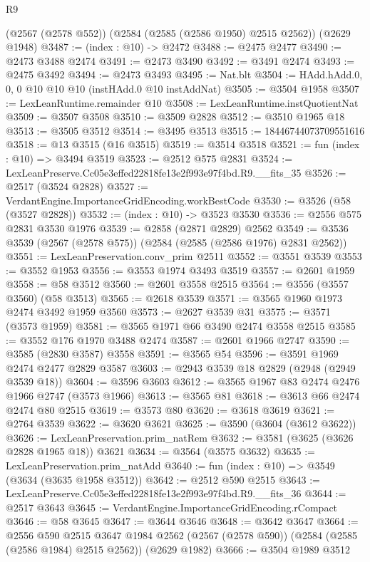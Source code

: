 \begin{lexlean}{R9}
\begin{coremodule}
    (@2567 (@2578 @552))
    (@2584 (@2585 (@2586 @1950) @2515 @2562))
    (@2629 @1948)
@3487 := (index : @10) -> @2472
@3488 := @2475 @2477
@3490 := @2473 @3488 @2474
@3491 := @2473 @3490
@3492 := @3491 @2474
@3493 := @2475 @3492
@3494 := @2473 @3493
@3495 := Nat.blt
@3504 := HAdd.hAdd.{0, 0, 0} @10 @10 @10 (instHAdd.{0} @10 instAddNat)
@3505 := @3504 @1958
@3507 := LexLeanRuntime.remainder @10
@3508 := LexLeanRuntime.instQuotientNat
@3509 := @3507 @3508
@3510 := @3509 @2828
@3512 := @3510 @1965 @18
@3513 := @3505 @3512
@3514 := @3495 @3513
@3515 := 18446744073709551616
@3518 := @13 @3515 (@16 @3515)
@3519 := @3514 @3518
@3521 := fun (index : @10) => @3494 @3519
@3523 := @2512 @575 @2831
@3524 := LexLeanPreserve.Cc05e3effed22818fe13e2f993e97f4bd.R9.__fits_35
@3526 := @2517 (@3524 @2828)
@3527 := VerdantEngine.ImportanceGridEncoding.workBestCode
@3530 := @3526 (@58 (@3527 @2828))
@3532 := (index : @10) -> @3523 @3530
@3536 := @2556 @575 @2831 @3530 @1976
@3539 := @2858 (@2871 @2829) @2562
@3549 := @3536 @3539 (@2567 (@2578 @575)) (@2584 (@2585 (@2586 @1976) @2831 @2562))
@3551 := LexLeanPreservation.conv_prim @2511
@3552 := @3551 @3539
@3553 := @3552 @1953
@3556 := @3553 @1974 @3493 @3519
@3557 := @2601 @1959
@3558 := @58 @3512
@3560 := @2601 @3558 @2515
@3564 := @3556 (@3557 @3560) (@58 @3513)
@3565 := @2618 @3539
@3571 := @3565 @1960 @1973 @2474 @3492 @1959 @3560
@3573 := @2627 @3539 @31
@3575 := @3571 (@3573 @1959)
@3581 := @3565 @1971 @66 @3490 @2474 @3558 @2515
@3585 := @3552 @176 @1970 @3488 @2474
@3587 := @2601 @1966 @2747
@3590 := @3585 (@2830 @3587) @3558
@3591 := @3565 @54
@3596 := @3591 @1969 @2474 @2477 @2829 @3587
@3603 := @2943 @3539 @18 @2829 (@2948 (@2949 @3539 @18))
@3604 := @3596 @3603
@3612 := @3565 @1967 @83 @2474 @2476 @1966 @2747 (@3573 @1966)
@3613 := @3565 @81
@3618 := @3613 @66 @2474 @2474 @80 @2515
@3619 := @3573 @80
@3620 := @3618 @3619
@3621 := @2764 @3539
@3622 := @3620 @3621
@3625 := @3590 (@3604 (@3612 @3622))
@3626 := LexLeanPreservation.prim_natRem
@3632 := @3581 (@3625 (@3626 @2828 @1965 @18)) @3621
@3634 := @3564 (@3575 @3632)
@3635 := LexLeanPreservation.prim_natAdd
@3640 := fun (index : @10) => @3549 (@3634 (@3635 @1958 @3512))
@3642 := @2512 @590 @2515
@3643 := LexLeanPreserve.Cc05e3effed22818fe13e2f993e97f4bd.R9.__fits_36
@3644 := @2517 @3643
@3645 := VerdantEngine.ImportanceGridEncoding.rCompact
@3646 := @58 @3645
@3647 := @3644 @3646
@3648 := @3642 @3647
@3664 := @2556
    @590
    @2515
    @3647
    @1984
    @2562
    (@2567 (@2578 @590))
    (@2584 (@2585 (@2586 @1984) @2515 @2562))
    (@2629 @1982)
@3666 := @3504 @1989 @3512

\end{coremodule}
\end{lexlean}

